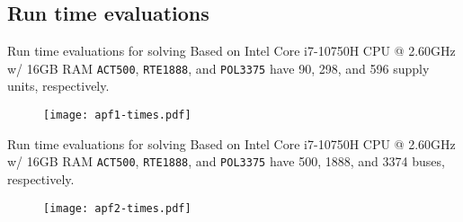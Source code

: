 \subsection{Run time evaluations}

\begin{frame}[t]{Run time evaluations for solving \XED}{%
    Based on Intel Core i7-10750H CPU @ 2.60GHz w/ 16GB RAM}
    \texttt{ACT500}, \texttt{RTE1888}, and \texttt{POL3375}
    have 90, 298, and 596 supply units, respectively.
    \begin{figure} \texttt{[image: apf1-times.pdf]} \end{figure}
\end{frame}

\begin{frame}[t]{Run time evaluations for solving \APFE}{%
    Based on Intel Core i7-10750H CPU @ 2.60GHz w/ 16GB RAM}
    \texttt{ACT500}, \texttt{RTE1888}, and \texttt{POL3375}
    have 500, 1888, and 3374 buses, respectively.
    \begin{figure} \texttt{[image: apf2-times.pdf]} \end{figure}
\end{frame}
